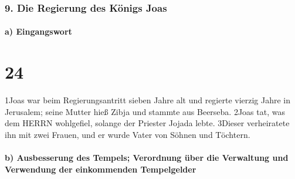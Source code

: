 \hypertarget{die-regierung-des-kuxf6nigs-joas}{%
\subsubsection{9. Die Regierung des Königs
Joas}\label{die-regierung-des-kuxf6nigs-joas}}

\hypertarget{a-eingangswort}{%
\paragraph{a) Eingangswort}\label{a-eingangswort}}

\hypertarget{section-23}{%
\section{24}\label{section-23}}

1Joas war beim Regierungsantritt sieben Jahre alt und regierte vierzig
Jahre in Jerusalem; seine Mutter hieß Zibja und stammte aus Beerseba.
2Joas tat, was dem HERRN wohlgefiel, solange der Priester Jojada lebte.
3Dieser verheiratete ihn mit zwei Frauen, und er wurde Vater von Söhnen
und Töchtern.

\hypertarget{b-ausbesserung-des-tempels-verordnung-uxfcber-die-verwaltung-und-verwendung-der-einkommenden-tempelgelder}{%
\paragraph{b) Ausbesserung des Tempels; Verordnung über die Verwaltung
und Verwendung der einkommenden
Tempelgelder}\label{b-ausbesserung-des-tempels-verordnung-uxfcber-die-verwaltung-und-verwendung-der-einkommenden-tempelgelder}}

